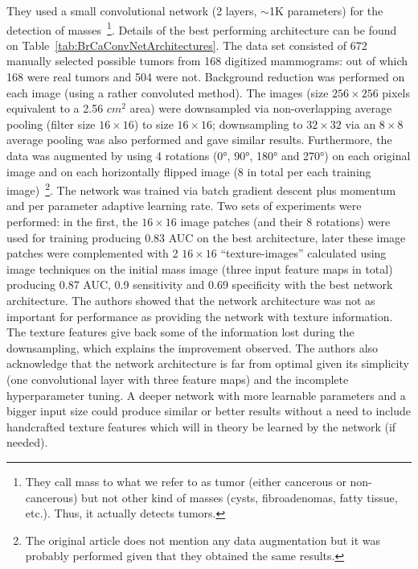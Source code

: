 They used a small convolutional network (2 layers, $\sim$1K parameters) for the detection of masses~\footnote{They call mass to what we refer to as tumor (either cancerous or non-cancerous) but not other kind of masses (cysts, fibroadenomas, fatty tissue, etc.). Thus, it actually detects tumors.}. Details of the best performing architecture can be found on Table~\ref{tab:BrCaConvNetArchitectures}. The data set consisted of 672 manually selected possible tumors from 168 digitized mammograms: out of which 168 were real tumors and 504 were not. Background reduction was performed on each image (using a rather convoluted method). The images (size $256 \times 256$ pixels equivalent to a 2.56 $cm^2$ area) were downsampled via non-overlapping average pooling (filter size $16 \times 16$) to size $16\times 16$; downsampling to $32 \times 32$ via an $8 \times 8$ average pooling was also performed and gave similar results. Furthermore, the data was augmented by using 4 rotations (0°, 90°, 180° and 270°) on each original image and on each horizontally flipped image (8 in total per each training image)~\footnote{The original article does not mention any data augmentation but it was probably performed given that they obtained the same results.}. The network was trained via batch gradient descent plus momentum and per parameter adaptive learning rate. Two sets of experiments were performed: in the first, the $16 \times 16$ image patches (and their 8 rotations) were used for training producing 0.83 AUC on the best architecture, later these image patches were complemented with 2 $16 \times 16$ ``texture-images'' calculated using image techniques on the initial mass image (three input feature maps in total) producing 0.87 AUC, 0.9 sensitivity and 0.69 specificity with the best network architecture. The authors showed that the network architecture was not as important for performance as providing the network with texture information. The texture features give back some of the information lost during the downsampling, which explains the improvement observed. The authors also acknowledge that the network architecture is far from optimal given its simplicity (one convolutional layer with three feature maps) and the incomplete hyperparameter tuning. A deeper network with more learnable parameters and a bigger input size could produce similar or better results without a need to include handcrafted texture features which will in theory be learned by the network (if needed).




